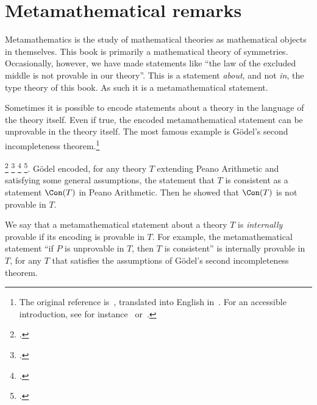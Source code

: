 \chapter{Metamathematical remarks}
\label{app:metamath}

Metamathematics is the study of mathematical theories as
mathematical objects in themselves.
This book is primarily a mathematical theory of symmetries.
Occasionally, however, we have made statements like
``the law of the excluded middle is not provable in our theory''.
This is a statement \emph{about}, and not \emph{in}, the type theory of this book.
As such it is a metamathematical statement.

Sometimes it is possible to encode statements
about a theory in the language of the theory itself.%
Even if true, the encoded metamathematical statement can
be unprovable in the theory itself.
The most famous example is G\"{o}del's second incompleteness theorem.\footnote{%
  The original reference is~\citeauthor{Goedel2nd}\footnotemark{},
  translated into English in~\citeauthor{Heijenoort-source}\footnotemark{}.
  For an accessible introduction, see for instance~\citeauthor{Franzen-Goedel}\footnotemark{}
  or~\citeauthor{Smullyan-Goedel}\footnotemark{}.}%
\addtocounter{footnote}{-4}%
\footcitetext{Goedel2nd}%
\footcitetext{Heijenoort-source}%
\footcitetext{Franzen-Goedel}%
\footcitetext{Smullyan-Goedel}.
G\"{o}del encoded, for any theory $T$ extending Peano Arithmetic and satisfying
some general assumptions, the statement that $T$ is consistent as
a statement $\Con(T)$ in Peano Arithmetic.
Then he showed that $\Con(T)$ is not provable in $T$.

We say that a metamathematical statement about a theory $T$
is \emph{internally} provable if its encoding is provable in $T$.
For example, the metamathematical statement ``if $P$ is unprovable in $T$,
then $T$ is consistent'' is internally provable in $T$, for any $T$ that
satisfies the assumptions of G\"{o}del's second incompleteness theorem.

